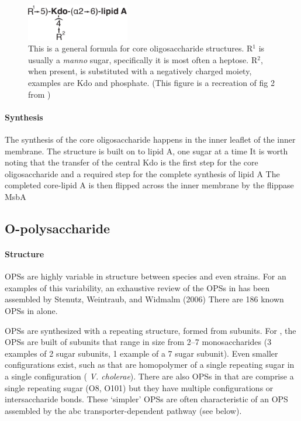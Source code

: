 \begin{figure}[htb]
  	\begin{center}
   		\includegraphics[width=0.4\textwidth]{intro/img/coreformula.pdf}
   	\end{center}
   	\caption[A generalized formula for core oligosaccharides]{This is a general formula for core oligosaccharide structures. R$^1$ is usually a \textit{manno} sugar, specifically
it is most often a heptose. R$^2$, when present, is substituted with a
negatively charged moiety, examples are Kdo and phosphate. (This figure is a recreation of fig 2 from
) }
\label{fig:coreformula}
\end{figure}

    \paragraph{Synthesis} The synthesis of the core oligosaccharide happens in the inner leaflet of the inner membrane. The structure is built on to lipid A, one sugar at a
time It is worth noting that the transfer of the central Kdo is the first step for the core oligosaccharide and a required step for the complete
synthesis of lipid A The completed core-lipid A is then flipped across the inner membrane by the flippase MsbA

  \subsection{O-polysaccharide}\label{sec:o-polysaccharide}

    \paragraph{Structure} \Acp{OPS} are highly variable in structure between species and even strains. For an examples of this variability, an exhaustive review of the \acp{OPS} in
\ecoli has been assembled by Stenutz, Weintraub, and Widmalm (2006) There are 186 known \acp{OPS} in \ecoli alone.

\Acp{OPS} are synthesized with a repeating structure, formed from subunits. For \ecoli, the \acp{OPS} are built of subunits that range in size from 2--7 monosaccharides (3 examples
of 2 sugar subunits, 1 example of a 7 sugar subunit). Even smaller configurations exist, such as that are homopolymer of a single repeating sugar in a single configuration (\eg
\textit{V. cholerae}). There are also  \acp{OPS} in \ecoli that are comprise a single repeating sugar (O8, O101) but they have multiple
configurations or intersaccharide bonds. These `simpler' \acp{OPS} are often characteristic of an \ac{OPS} assembled by the \ac{abc} transporter-dependent pathway (see below).
 
